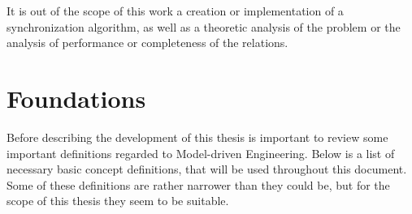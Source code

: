 \documentclass[tuberlin,cic,tc,english,noabntcite]{iiufrgs}
\begin{document}
It is out of the scope of this work a creation or implementation of a synchronization algorithm, as well as a theoretic analysis of the problem or the analysis of performance or completeness of the relations.

\chapter{Foundations}
\label{ch:foundations}
Before describing the development of this thesis is important to review some important definitions regarded to Model-driven Engineering. Below is a list of necessary basic concept definitions, that will be used throughout this document. Some of these definitions are rather narrower than they could be, but for the scope of this thesis they seem to be suitable.
\end{document}
